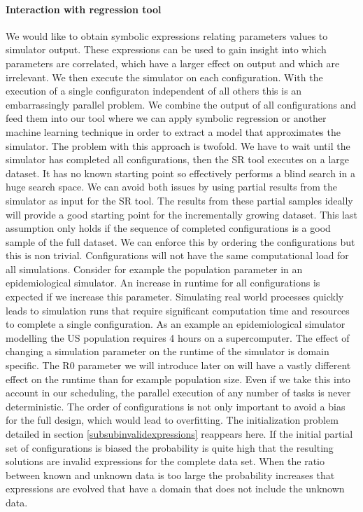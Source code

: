\paragraph{Interaction with regression tool}
We would like to obtain symbolic expressions relating parameters values to simulator output. These expressions can be used to gain insight into which parameters are correlated, which have a larger effect on output and which are irrelevant. 
We then execute the simulator on each configuration. With the execution of a single configuraton independent of all others this is an embarrassingly parallel problem. We combine the output of all configurations and feed them into our tool where we can apply symbolic regression or another machine learning technique in order to extract a model that approximates the simulator. The problem with this approach is twofold. We have to wait until the simulator has completed all configurations, then the SR tool executes on a large dataset. It has no known starting point so effectively performs a blind search in a huge search space. We can avoid both issues by using partial results from the simulator as input for the SR tool. The results from these partial samples ideally will provide a good starting point for the incrementally growing dataset. This last assumption only holds if the sequence of completed configurations is a good sample of the full dataset. We can enforce this by ordering the configurations but this is non trivial. Configurations will not have the same computational load for all simulations. Consider for example the population parameter in an epidemiological simulator. An increase in runtime for all configurations is expected if we increase this parameter. Simulating real world processes quickly leads to simulation runs that require significant computation time and resources to complete a single configuration. As an example an epidemiological simulator modelling the US population \cite{FRED} requires 4 hours on a supercomputer. The effect of changing a simulation parameter on the runtime of the simulator is domain specific. The R0 parameter we will introduce later on will have a vastly different effect on the runtime than for example population size.
Even if we take this into account in our scheduling, the parallel execution of any number of tasks is never deterministic. The order of configurations is not only important to avoid a bias for the full design, which would lead to overfitting. The initialization problem detailed in section \ref{subsubinvalidexpressions} reappears here. If the initial partial set of configurations is biased the probability is quite high that the resulting solutions are invalid expressions for the complete data set. When the ratio between known and unknown data is too large the probability increases that expressions are evolved that have a domain that does not include the unknown data.

